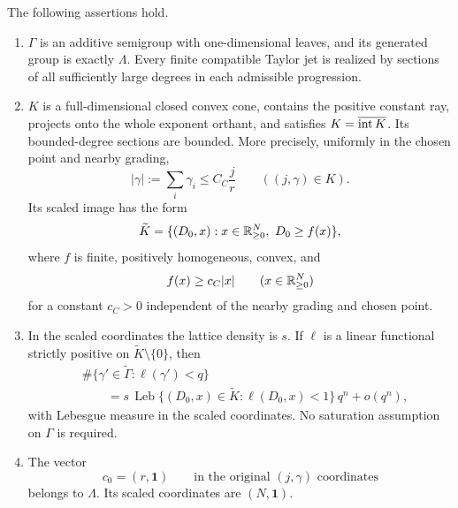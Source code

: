 \begin{proposition}\label{jet:setup}
The following assertions hold.
\begin{enumerate}[label=\textup{(\roman*)}]
\item
$\Gamma$ is an additive semigroup with one-dimensional leaves, and its
generated group is exactly $\Lambda$. Every finite compatible Taylor
jet is realized by sections of all sufficiently large degrees in each
admissible progression.
\item
$K$ is a full-dimensional closed convex cone, contains the positive
constant ray, projects onto the whole exponent orthant, and satisfies
$K=\overline{\operatorname{int} K}$. Its bounded-degree sections are bounded. More
precisely, uniformly in the chosen point and nearby grading,
\begin{equation}\label{jet:bezout-bound}
 |\gamma|:=\sum_i\gamma_i\le C_C\frac jr
                       \qquad ((j,\gamma)\in K).
\end{equation}
Its scaled image has the form
\begin{equation}\label{jet:epigraph}
 \widetilde K=\{(D_0,x):x\in\mathbb R_{\ge0}^N,\ D_0\ge f(x)\},
\end{equation}
where $f$ is finite, positively
homogeneous, convex, and
\begin{equation}\label{jet:f-coercive}
 f(x)\ge c_C|x|\qquad(x\in\mathbb R_{\ge0}^N)
\end{equation}
for a constant $c_C>0$ independent of the nearby grading and chosen
point.
\item
In the scaled coordinates the lattice density is $s$. If $\ell$ is a
linear functional strictly positive on $\widetilde K\setminus\{0\}$, then
\begin{equation}\label{jet:count}
 \begin{aligned}
 &\#\{\gamma'\in\widetilde\Gamma:\ell(\gamma')<q\}\\
 &\qquad=s\,\operatorname{Leb}\{(D_0,x)\in\widetilde K:\ell(D_0,x)<1\}\,q^n+o(q^n),
 \end{aligned}
\end{equation}
with Lebesgue measure in the scaled coordinates. No saturation
assumption on $\Gamma$ is required.
\item
The vector
\begin{equation}\label{jet:canonical-vector}
 c_0=(r,\mathbf1)\qquad\text{in the original }(j,\gamma)
 \text{ coordinates}
\end{equation}
belongs to $\Lambda$. Its scaled coordinates are $(N,\mathbf1)$.
\end{enumerate}
\end{proposition}

